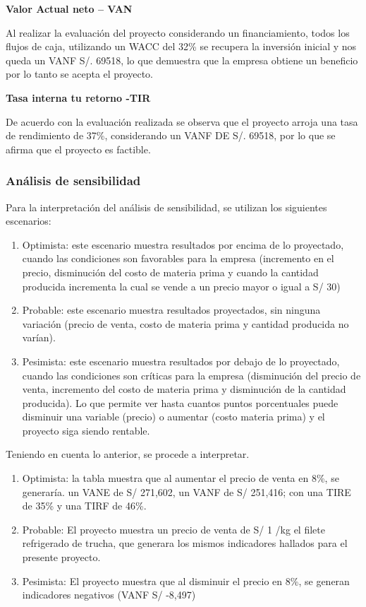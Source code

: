 \documentclass[
  stu,
  floatsintext,
  longtable,
  a4paper,
  nolmodern,
  notxfonts,
  notimes,
  12pt,
  colorlinks=true,linkcolor=blue,citecolor=blue,urlcolor=blue]{apa7}
\providecommand{\tightlist}{%
  \setlength{\itemsep}{0pt}\setlength{\parskip}{0pt}}
\begin{document}
\textbf{Valor Actual neto -- VAN}

Al realizar la evaluación del proyecto considerando un financiamiento,
todos los flujos de caja, utilizando un WACC del 32\% se recupera la
inversión inicial y nos queda un VANF S/. 69518, lo que demuestra que la
empresa obtiene un beneficio por lo tanto se acepta el proyecto.

\textbf{Tasa interna tu retorno -TIR}

De acuerdo con la evaluación realizada se observa que el proyecto arroja
una tasa de rendimiento de 37\%, considerando un VANF DE S/. 69518, por
lo que se afirma que el proyecto es factible.

\subsubsection{Análisis de
sensibilidad}\label{anuxe1lisis-de-sensibilidad}

Para la interpretación del análisis de sensibilidad, se utilizan los
siguientes escenarios:

\begin{enumerate}
\def\labelenumi{\arabic{enumi}.}
\tightlist
\item
  Optimista: este escenario muestra resultados por encima de lo
  proyectado, cuando las condiciones son favorables para la empresa
  (incremento en el precio, disminución del costo de materia prima y
  cuando la cantidad producida incrementa la cual se vende a un precio
  mayor o igual a S/ 30)
\item
  Probable: este escenario muestra resultados proyectados, sin ninguna
  variación (precio de venta, costo de materia prima y cantidad
  producida no varían).
\item
  Pesimista: este escenario muestra resultados por debajo de lo
  proyectado, cuando las condiciones son críticas para la empresa
  (disminución del precio de venta, incremento del costo de materia
  prima y disminución de la cantidad producida). Lo que permite ver
  hasta cuantos puntos porcentuales puede disminuir una variable
  (precio) o aumentar (costo materia prima) y el proyecto siga siendo
  rentable.
\end{enumerate}

Teniendo en cuenta lo anterior, se procede a interpretar.

\begin{enumerate}
\def\labelenumi{\arabic{enumi}.}
\tightlist
\item
  Optimista: la tabla muestra que al aumentar el precio de venta en 8\%,
  se generaría. un VANE de S/ 271,602, un VANF de S/ 251,416; con una
  TIRE de 35\% y una TIRF de 46\%.
\item
  Probable: El proyecto muestra un precio de venta de S/ 1 /kg el filete
  refrigerado de trucha, que generara los mismos indicadores hallados
  para el presente proyecto.
\item
  Pesimista: El proyecto muestra que al disminuir el precio en 8\%, se
  generan indicadores negativos (VANF S/ -8,497)
\end{enumerate}
\end{document}

